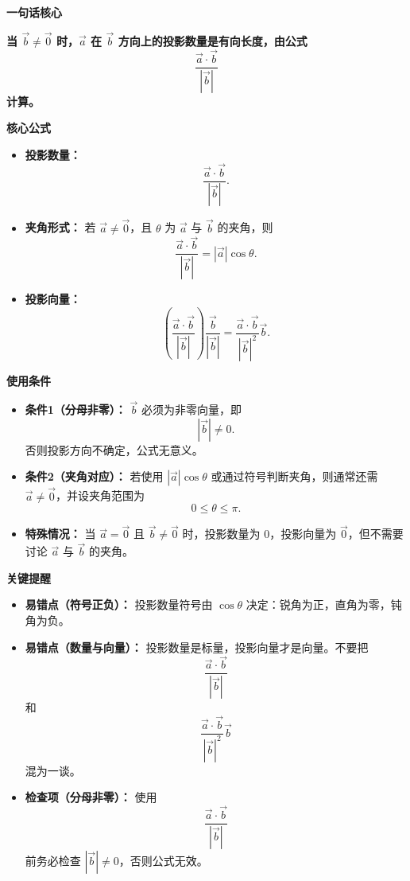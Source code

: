 \begin{summarybox}

	\textbf{\textcolor{CSummary}{一句话核心}}

	\textbf{当 $\vec b\neq\vec 0$ 时，$\vec a$ 在 $\vec b$ 方向上的投影数量是有向长度，由公式}
	\[
		\frac{\vec a\cdot\vec b}{|\vec b|}
	\]
	\textbf{计算。}

	\medskip
	\textbf{\textcolor{CSummary}{核心公式}}

	\begin{itemize}[leftmargin=*, itemsep=0.5em, topsep=0.4em]
		\item \textbf{投影数量：}
		      \[
			      \frac{\vec a\cdot\vec b}{|\vec b|}.
		      \]

		\item \textbf{夹角形式：} 若 $\vec a\neq\vec 0$，且 $\theta$ 为 $\vec a$ 与 $\vec b$ 的夹角，则
		      \[
			      \frac{\vec a\cdot\vec b}{|\vec b|}
			      =
			      |\vec a|\cos\theta .
		      \]

		\item \textbf{投影向量：}
		      \[
			      \left(\frac{\vec a\cdot\vec b}{|\vec b|}\right)\frac{\vec b}{|\vec b|}
			      =
			      \frac{\vec a\cdot\vec b}{|\vec b|^2}\vec b.
		      \]
	\end{itemize}

	\medskip
	\textbf{\textcolor{CSummary}{使用条件}}
	\begin{itemize}[leftmargin=*, itemsep=0.5em, topsep=0.4em]
		\item \textbf{条件1（分母非零）：} $\vec b$ 必须为非零向量，即
		      \[
			      |\vec b|\neq0.
		      \]
		      否则投影方向不确定，公式无意义。

		\item \textbf{条件2（夹角对应）：} 若使用 $|\vec a|\cos\theta$ 或通过符号判断夹角，则通常还需 $\vec a\neq\vec 0$，并设夹角范围为
		      \[
			      0\le\theta\le\pi.
		      \]

		\item \textbf{特殊情况：} 当 $\vec a=\vec 0$ 且 $\vec b\neq\vec 0$ 时，投影数量为 $0$，投影向量为 $\vec 0$，但不需要讨论 $\vec a$ 与 $\vec b$ 的夹角。
	\end{itemize}

	\medskip
	\textbf{\textcolor{CSummary}{关键提醒}}
	\begin{itemize}[leftmargin=*, itemsep=0.5em, topsep=0.4em]
		\item \textbf{易错点（符号正负）：} 投影数量符号由 $\cos\theta$ 决定：锐角为正，直角为零，钝角为负。

		\item \textbf{易错点（数量与向量）：} 投影数量是标量，投影向量才是向量。不要把
		      \[
			      \frac{\vec a\cdot\vec b}{|\vec b|}
		      \]
		      和
		      \[
			      \frac{\vec a\cdot\vec b}{|\vec b|^2}\vec b
		      \]
		      混为一谈。

		\item \textbf{检查项（分母非零）：} 使用
		      \[
			      \frac{\vec a\cdot\vec b}{|\vec b|}
		      \]
		      前务必检查 $|\vec b|\neq0$，否则公式无效。
	\end{itemize}

\end{summarybox}